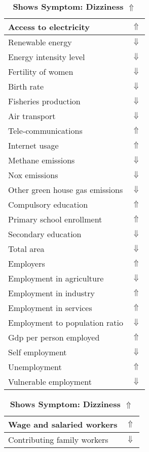 \documentclass[12pt,notitlepage,oneside]{report}
\begin{document}
\begin{table}[!htb]
\caption{\textbf{Shows Symptom: Dizziness $\Uparrow$}}
\centering
\label{Correlated Socio-economic Factors0}
\begin{tabular}{|l|l|}
\hline
Access to electricity & $\Uparrow$\\ \hline
Renewable energy & $\Downarrow$\\ \hline
Energy intensity level & $\Downarrow$\\ \hline
Fertility of women & $\Downarrow$\\ \hline
Birth rate & $\Downarrow$\\ \hline
Fisheries production & $\Downarrow$\\ \hline
Air transport  & $\Downarrow$\\ \hline
Tele-communications & $\Uparrow$\\ \hline
Internet usage & $\Uparrow$\\ \hline
Methane emissions & $\Downarrow$\\ \hline
Nox emissions & $\Downarrow$\\ \hline
Other green house gas emissions & $\Downarrow$\\ \hline
Compulsory education & $\Uparrow$\\ \hline
Primary school enrollment & $\Uparrow$\\ \hline
Secondary education & $\Downarrow$\\ \hline
Total area & $\Downarrow$\\ \hline
Employers & $\Uparrow$\\ \hline
Employment in agriculture & $\Downarrow$\\ \hline
Employment in industry & $\Uparrow$\\ \hline
Employment in services & $\Uparrow$\\ \hline
Employment to population ratio & $\Downarrow$\\ \hline
Gdp per person employed & $\Uparrow$\\ \hline
Self employment & $\Downarrow$\\ \hline
Unemployment & $\Uparrow$\\ \hline
Vulnerable employment & $\Downarrow$\\ \hline
\end{tabular}
\begin{tabular}{|l|l|}
\hline
Wage and salaried workers & $\Uparrow$\\ \hline
Contributing family workers & $\Downarrow$\\ \hline

\end{tabular}
\end{table}
\end{document}
